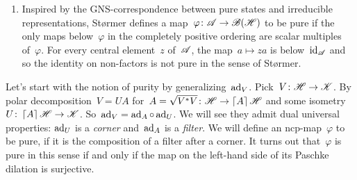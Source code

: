 \documentclass[b]{subfiles}
\begin{document}
\begin{parsec}
\begin{point}
\begin{point}
\begin{enumerate}
\item
Inspired by the GNS-correspondence between pure states and
    irreducible representations,
St\o rmer defines a map~$\varphi\colon \mathscr{A} \to \mathscr{B}(\mathscr{H})$ to be pure
    if the only maps below~$\varphi$ in the completely positive ordering
    are scalar multiples of~$\varphi$.
For every central element~$z$ of~$\mathscr{A}$,
    the map~$a \mapsto za$ is below~$\operatorname{id}_{\mathscr{A}}$
    and so the identity on non-factors is not pure in the sense
        of St\o rmer.
\end{enumerate}
\end{point}
\begin{point}%
Let's start with the notion of purity by generalizing~$\mathrm{ad}_V$.
Pick~$V \colon \mathscr{H} \to \mathscr{K}$.
By polar decomposition~$V = U A$
    for~$A = \sqrt{V^*V} \colon \mathscr{H} \to \left\lceil A\right\rceil \mathscr{H}$
    and some isometry~$U \colon \left\lceil A\right\rceil \mathscr{H} \to \mathscr{K}$.
So~$\mathrm{ad}_V = \mathrm{ad}_A \mathop{\circ} \mathrm{ad}_U$.
We will see they admit dual universal properties:
    $\mathrm{ad}_U$ is a \emph{corner}
    and~$\mathrm{ad}_A$ is a \emph{filter}.
We will define an ncp-map~$\varphi$ to be pure,
    if it is the composition of a filter after a corner.
It turns out that~$\varphi$ is pure in this sense
    if and only if the map on the left-hand side of
    its Paschke dilation is surjective.
\end{point}
\end{point}
\end{parsec}
\end{document}
